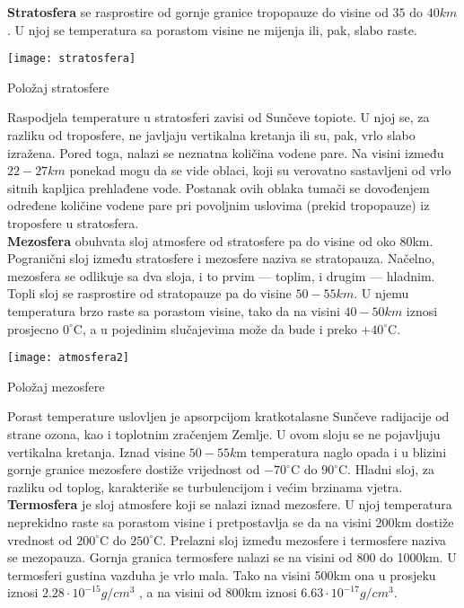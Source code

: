 \textbf{Stratosfera} se rasprostire od gornje granice tropopauze do visine od $35$ do $40km$. U njoj se temperatura sa porastom visine ne mijenja ili, pak, slabo raste. 
	\begin{marginfigure}%
		\texttt{[image: stratosfera]}
		\caption{Položaj stratosfere}
		\label{fig:stratosfera}
	\end{marginfigure} 
Raspodjela temperature u stratosferi zavisi od Sunčeve topiote. U njoj se, za razliku od troposfere, ne javljaju vertikalna kretanja ili su, pak, vrlo slabo izražena. Pored toga, nalazi se neznatna količina vodene pare. Na visini između $22-27km$ ponekad mogu da se vide oblaci, koji su verovatno sastavljeni od vrlo sitnih kapljica prehlađene vode. Postanak ovih oblaka tumači se dovođenjem određene količine vodene pare pri povoljnim uslovima (prekid tropopauze) iz troposfere u stratosfera.\\

\textbf{Mezosfera} obuhvata sloj atmosfere od stratosfere pa do visine od oko 80km. Pogranični sloj između stratosfere i mezosfere naziva se stratopauza. Načelno, mezosfera se odlikuje sa dva sloja, i to prvim — toplim, i drugim — hladnim. Topli sloj se rasprostire od stratopauze pa do visine $50-55km$. U njemu temperatura brzo raste sa porastom visine, tako da na visini $ 40-50km$ iznosi prosjecno $0 ^\circ$C, a u pojedinim slučajevima može da bude i preko $+40^\circ$C. 

	\begin{marginfigure}%
		\texttt{[image: atmosfera2]}
		\caption{Položaj mezosfere}
		\label{fig:atmosfera2}
	\end{marginfigure}
Porast temperature uslovljen je apsorpcijom kratkotalasne Sunčeve radijacije od strane ozona, kao i toplotnim zračenjem Zemlje. U ovom sloju se ne pojavljuju vertikalna kretanja. Iznad visine $50-55k$m temperatura naglo opada i u blizini gornje granice mezosfere dostiže vrijednost od $-70^\circ$C do $ 90^\circ$C. Hladni sloj, za razliku od toplog, karakteriše se turbulencijom i većim brzinama vjetra.\\

\textbf{Termosfera} je sloj atmosfere koji se nalazi iznad mezosfere. U njoj temperatura neprekidno raste sa porastom visine i pretpostavlja se da na visini 200km dostiže vrednost od $200^\circ$C do $250^\circ$C. Prelazni sloj između mezosfere i termosfere naziva se mezopauza. Gornja granica termosfere nalazi se na visini od 800 do 1000km. U termosferi gustina vazduha je vrlo mala. Tako na visini 500km ona u prosjeku iznosi $2.28\cdot10^{-15} g/cm^{3}$  , a na visini od 800km iznosi $6.63\cdot10^{-17} g/cm^{3}$. 

